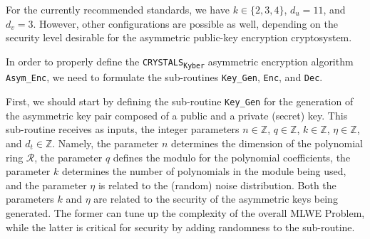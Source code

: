 \documentclass[runningheads]{llncs}
\numberwithin{equation}{section}
\begin{document}
    \noindent For the currently recommended standards, we have $k \in \{2, 3, 4\}$, ${d}_{u} = 11$, and ${d}_{v} = 3$. However, other configurations are possible as well, depending on the security level desirable for the asymmetric public-key encryption cryptosystem.

    \noindent In order to properly define the \texorpdfstring{\texttt{CRYSTALS}\textsubscript{\texttt{Kyber}}}\/ asymmetric encryption algorithm \texttt{Asym\_Enc}, we need to formulate the sub-routines \texttt{Key\_Gen}, \texttt{Enc}, and \texttt{Dec}.

    \clearpage
    
    First, we should start by defining the sub-routine \texttt{Key\_Gen} for the generation of the asymmetric key pair composed of a public and a private (secret) key. This sub-routine receives as inputs, the integer parameters $n \in \mathbb{Z}$, $q \in \mathbb{Z}$, $k \in \mathbb{Z}$, $\eta \in \mathbb{Z}$, and ${d}_{t} \in \mathbb{Z}$. Namely, the parameter $n$ determines the dimension of the polynomial ring $\mathcal{R}$, the parameter $q$ defines the modulo for the polynomial coefficients, the parameter $k$ determines the number of polynomials in the module being used, and the parameter $\eta$ is related to the (random) noise distribution. Both the parameters $k$ and $\eta$ are related to the security of the asymmetric keys being generated. The former can tune up the complexity of the overall MLWE Problem, while the latter is critical for security by adding randomness to the sub-routine.

    \vspace{2ex}
\end{document}

